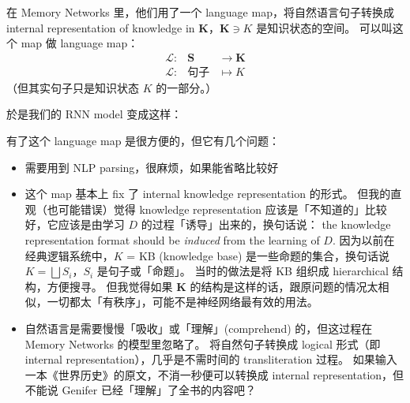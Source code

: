 \documentclass[12pt]{article}
\begin{document}
在 Memory Networks\cite{Weston2015} 里，他们用了一个 language map，将自然语言句子转换成 internal representation of knowledge in $\mathbf{K}$，$\mathbf{K} \ni K$ 是知识状态的空间。 可以叫这个 map 做 language map：
\begin{eqnarray}
\mathcal{L} :& \mathbf{S} & \rightarrow \mathbf{K} \nonumber \\
\mathcal{L} :& \mbox{句子} & \mapsto K \nonumber
\end{eqnarray}
（但其实句子只是知识状态 $K$ 的一部分。）

於是我们的 RNN model 变成这样：
\begin{center}
\end{center}

有了这个 language map 是很方便的，但它有几个问题：
\begin{itemize}

\item 需要用到 NLP parsing，很麻烦，如果能省略比较好

\item 这个 map 基本上 fix 了 internal knowledge representation 的形式。 但我的直观（也可能错误）觉得 knowledge representation 应该是「不知道的」比较好，它应该是由学习 $D$ 的过程「诱导」出来的，换句话说： the knowledge representation format should be \textit{induced} from the learning of $D$.  因为以前在经典逻辑系统中，$K$ = KB (knowledge base) 是一些命题的集合，换句话说 $ K = \bigsqcup S_i $，$S_i$ 是句子或「命题」。  当时的做法是将 KB 组织成 hierarchical 结构，方便搜寻。 但我觉得如果 $\mathbf{K}$ 的结构是这样的话，跟原问题的情况太相似，一切都太「有秩序」，可能不是神经网络最有效的用法。

\item 自然语言是需要慢慢「吸收」或「理解」(comprehend) 的，但这过程在 Memory Networks 的模型里忽略了。  将自然句子转换成 logical 形式（即 internal representation），几乎是不需时间的 transliteration 过程。  如果输入一本《世界历史》的原文，不消一秒便可以转换成 internal representation，但不能说 Genifer 已经「理解」了全书的内容吧？

\end{itemize}
\end{document}
